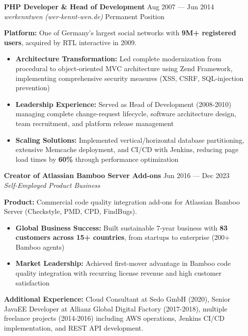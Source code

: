 \documentclass[11pt,a4paper]{article}
\newcommand{\jobtitle}[4]{%
  \vspace{4pt}
  {\bfseries #1} \hfill {\color{lightgray}\small #2}\\
  {\itshape #3} \hfill {\color{lightgray}\small #4}
  \vspace{2pt}
}
\begin{document}
\vspace{6pt}

\jobtitle{PHP Developer \& Head of Development}{Aug 2007 --- Jun 2014}{werkenntwen (wer-kennt-wen.de)}{Permanent Position}

\textbf{Platform:} One of Germany's largest social networks with \textbf{9M+ registered users}, acquired by RTL interactive in 2009.

\begin{itemize}
\item \textbf{Architecture Transformation:} Led complete modernization from procedural to object-oriented MVC architecture using Zend Framework, implementing comprehensive security measures (XSS, CSRF, SQL-injection prevention)
\item \textbf{Leadership Experience:} Served as Head of Development (2008-2010) managing complete change-request lifecycle, software architecture design, team recruitment, and platform release management
\item \textbf{Scaling Solutions:} Implemented vertical/horizontal database partitioning, extensive Memcache deployment, and CI/CD with Jenkins, reducing page load times by \textbf{60\%} through performance optimization
\end{itemize}

\vspace{6pt}

\jobtitle{Creator of Atlassian Bamboo Server Add-ons}{Jun 2016 --- Dec 2023}{Self-Employed Product Business}{}

\textbf{Product:} Commercial code quality integration add-ons for Atlassian Bamboo Server (Checkstyle, PMD, CPD, FindBugs).

\begin{itemize}
\item \textbf{Global Business Success:} Built sustainable 7-year business with \textbf{83 customers across 15+ countries}, from startups to enterprise (200+ Bamboo agents)
\item \textbf{Market Leadership:} Achieved first-mover advantage in Bamboo code quality integration with recurring license revenue and high customer satisfaction
\end{itemize}

\vspace{6pt}

\textbf{Additional Experience:} Cloud Consultant at Sedo GmbH (2020), Senior JavaEE Developer at Allianz Global Digital Factory (2017-2018), multiple freelance projects (2014-2016) including AWS operations, Jenkins CI/CD implementation, and REST API development.
\end{document}
